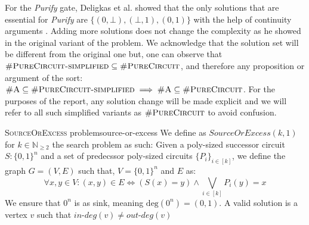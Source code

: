 \begin{table}[h!]
    \centering
 \quad
{}

    \caption{Three-valued logic \cite{kleene_IntroductionMetamathematics_2009}}\label{tab:three-val-logic}
\end{table}




For the \textit{Purify} gate,
Deligkas et al. showed that the only solutions that are essential for \textit{Purify}
are $\{(0,\bot), (\bot,1), (0,1)\}$ with the help of continuity arguments \cite{deligkas_PureCircuitTightInapproximability_2024}.
Adding more solutions does not change the complexity as he showed in the original variant of the problem.
We acknowledge that the solution set will be different from the original one but,
one can observe that  $\textsc{\#PureCircuit-simplified} \subseteq \textsc{\#PureCircuit}$,
and therefore any proposition or argument of the sort:
$\textsc{\#A} \subseteq \textsc{\#PureCircuit-simplified} \implies \textsc{\#A} \subseteq \textsc{\#PureCircuit}$.
For the purposes of the report, any solution change will be made explicit
and we will refer to all such simplified variants as $\textsc{\#PureCircuit}$ to avoid
confusion. 



\begin{definitionbox}{\textsc{SourceOrExcess} problem}{source-or-excess}
    We define as $\textit{SourceOrExcess}(k,1)$ for $k \in \mathbb{N}_{\geq 2}$
    the search problem as such: Given a poly-sized successor circuit $S : \{0,1\}^n$
    and a set of predecssor poly-sized circuits $\{P_i\}_{i \in [k]}$, we define
    the graph $G = (V,E)$ such that, $V = \{0,1\}^n$ and $E$ as:
    $$
    \forall x, y \in V: (x,y) \in E \iff (S(x) = y) \wedge \bigvee_{i \in [k]} P_i(y) = x
    $$
    We ensure that $0^n$ is as sink, meaning $\text{deg}(0^n) = (0,1)$.
    A valid solution is a vertex $v$ such that $\textit{in-deg}(v) \neq \textit{out-deg}(v)$
\end{definitionbox}

